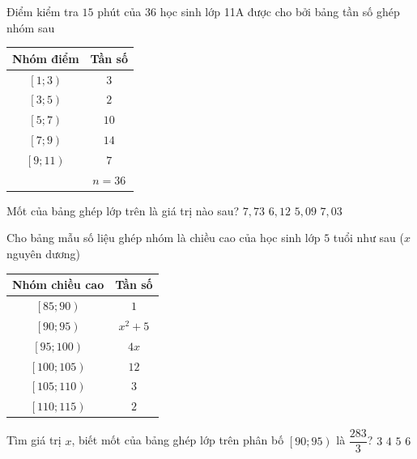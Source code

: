 \begin{ex}%
	Điểm kiểm tra $15$ phút của $36$ học sinh lớp 11A được cho bởi bảng tần số ghép nhóm sau
	\begin{center}
		\begin{tabular}{|c|c|}
			\hline
			Nhóm điểm & Tần số \\
			\hline
			$\left[1;3\right)$ & $3$ \\
			\hline
			$\left[3;5\right)$ & $2$ \\
			\hline
			$\left[5;7\right)$ & $10$ \\
			\hline
			$\left[7;9\right)$ & $14$ \\
			\hline
			$\left[9;11\right)$ & $7$ \\
			\hline
			& $n=36$ \\
			\hline
		\end{tabular}
	\end{center}
	Mốt của bảng ghép lớp trên là giá trị nào sau?
	\choice
	{\True $7{,}73$}
	{$6{,}12$}
	{$5{,}09$}
	{$7{,}03$}
\end{ex}

\begin{ex}%
	Cho bảng mẫu số liệu ghép nhóm là chiều cao của học sinh lớp $5$ tuổi như sau ($x$ nguyên dương)
	\begin{center}
		\begin{tabular}{|c|c|}
			\hline
			Nhóm chiều cao & Tần số \\
			\hline
			$\left[85;90\right)$ & $1$ \\
			\hline
			$\left[90;95\right)$ & $x^2+5$ \\
			\hline
			$\left[95;100\right)$ & $4x$ \\
			\hline
			$\left[100;105\right)$ & $12$ \\
			\hline
			$\left[105;110\right)$ & $3$ \\
			\hline
			$\left[110;115\right)$ & $2$ \\
			\hline
		\end{tabular}
	\end{center}
	Tìm giá trị $x$, biết mốt của bảng ghép lớp trên phân bố $\left[90;95\right)$ là $\dfrac{283}{3}$?
	\choice
	{\True $3$}
	{$4$}
	{$5$}
	{$6$}
\end{ex}

